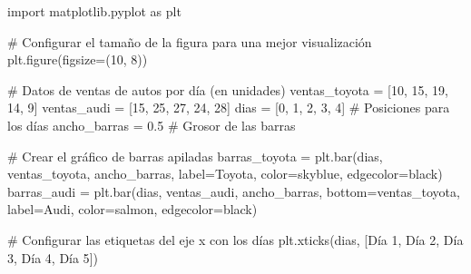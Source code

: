 \documentclass[
  jou,
  floatsintext,
  longtable,
  a4paper,
  nolmodern,
  notxfonts,
  notimes,
  colorlinks=true,linkcolor=blue,citecolor=blue,urlcolor=blue]{apa7}
\newenvironment{Shaded}{\begin{snugshade}}{\end{snugshade}}
\newcommand{\CommentTok}[1]{\textcolor[rgb]{0.37,0.37,0.37}{#1}}
\newcommand{\DecValTok}[1]{\textcolor[rgb]{0.68,0.00,0.00}{#1}}
\newcommand{\FloatTok}[1]{\textcolor[rgb]{0.68,0.00,0.00}{#1}}
\newcommand{\ImportTok}[1]{\textcolor[rgb]{0.00,0.46,0.62}{#1}}
\newcommand{\NormalTok}[1]{\textcolor[rgb]{0.00,0.23,0.31}{#1}}
\newcommand{\OperatorTok}[1]{\textcolor[rgb]{0.37,0.37,0.37}{#1}}
\newcommand{\StringTok}[1]{\textcolor[rgb]{0.13,0.47,0.30}{#1}}
\begin{document}
\begin{Shaded}
\begin{Highlighting}[]
\ImportTok{import}\NormalTok{ matplotlib.pyplot }\ImportTok{as}\NormalTok{ plt}

\CommentTok{\# Configurar el tamaño de la figura para una mejor visualización}
\NormalTok{plt.figure(figsize}\OperatorTok{=}\NormalTok{(}\DecValTok{10}\NormalTok{, }\DecValTok{8}\NormalTok{))}

\CommentTok{\# Datos de ventas de autos por día (en unidades)}
\NormalTok{ventas\_toyota }\OperatorTok{=}\NormalTok{ [}\DecValTok{10}\NormalTok{, }\DecValTok{15}\NormalTok{, }\DecValTok{19}\NormalTok{, }\DecValTok{14}\NormalTok{, }\DecValTok{9}\NormalTok{]}
\NormalTok{ventas\_audi }\OperatorTok{=}\NormalTok{ [}\DecValTok{15}\NormalTok{, }\DecValTok{25}\NormalTok{, }\DecValTok{27}\NormalTok{, }\DecValTok{24}\NormalTok{, }\DecValTok{28}\NormalTok{]}
\NormalTok{dias }\OperatorTok{=}\NormalTok{ [}\DecValTok{0}\NormalTok{, }\DecValTok{1}\NormalTok{, }\DecValTok{2}\NormalTok{, }\DecValTok{3}\NormalTok{, }\DecValTok{4}\NormalTok{]  }\CommentTok{\# Posiciones para los días}
\NormalTok{ancho\_barras }\OperatorTok{=} \FloatTok{0.5}  \CommentTok{\# Grosor de las barras}

\CommentTok{\# Crear el gráfico de barras apiladas}
\NormalTok{barras\_toyota }\OperatorTok{=}\NormalTok{ plt.bar(dias, ventas\_toyota, ancho\_barras, label}\OperatorTok{=}\StringTok{\textquotesingle{}Toyota\textquotesingle{}}\NormalTok{, color}\OperatorTok{=}\StringTok{\textquotesingle{}skyblue\textquotesingle{}}\NormalTok{, edgecolor}\OperatorTok{=}\StringTok{\textquotesingle{}black\textquotesingle{}}\NormalTok{)}
\NormalTok{barras\_audi }\OperatorTok{=}\NormalTok{ plt.bar(dias, ventas\_audi, ancho\_barras, bottom}\OperatorTok{=}\NormalTok{ventas\_toyota, label}\OperatorTok{=}\StringTok{\textquotesingle{}Audi\textquotesingle{}}\NormalTok{, color}\OperatorTok{=}\StringTok{\textquotesingle{}salmon\textquotesingle{}}\NormalTok{, edgecolor}\OperatorTok{=}\StringTok{\textquotesingle{}black\textquotesingle{}}\NormalTok{)}

\CommentTok{\# Configurar las etiquetas del eje x con los días}
\NormalTok{plt.xticks(dias, [}\StringTok{\textquotesingle{}Día 1\textquotesingle{}}\NormalTok{, }\StringTok{\textquotesingle{}Día 2\textquotesingle{}}\NormalTok{, }\StringTok{\textquotesingle{}Día 3\textquotesingle{}}\NormalTok{, }\StringTok{\textquotesingle{}Día 4\textquotesingle{}}\NormalTok{, }\StringTok{\textquotesingle{}Día 5\textquotesingle{}}\NormalTok{])}


\end{Highlighting}
\end{Shaded}
\end{document}
